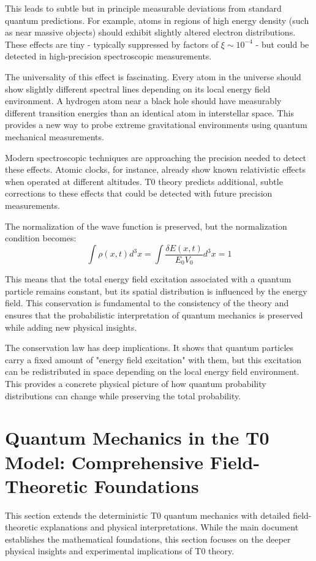 \documentclass[12pt,a4paper]{article}
\newcommand{\deltaE}{\delta E}
\newcommand{\xipar}{\xi}
\theoremstyle{definition}
\theoremstyle{remark}
\begin{document}
This leads to subtle but in principle measurable deviations from standard quantum predictions. For example, atoms in regions of high energy density (such as near massive objects) should exhibit slightly altered electron distributions. These effects are tiny - typically suppressed by factors of $\xipar \sim 10^{-4}$ - but could be detected in high-precision spectroscopic measurements.

The universality of this effect is fascinating. Every atom in the universe should show slightly different spectral lines depending on its local energy field environment. A hydrogen atom near a black hole should have measurably different transition energies than an identical atom in interstellar space. This provides a new way to probe extreme gravitational environments using quantum mechanical measurements.

Modern spectroscopic techniques are approaching the precision needed to detect these effects. Atomic clocks, for instance, already show known relativistic effects when operated at different altitudes. T0 theory predicts additional, subtle corrections to these effects that could be detected with future precision measurements.

The normalization of the wave function is preserved, but the normalization condition becomes:
$$\int \rho(x,t) d^3x = \int \frac{\deltaE(x,t)}{E_0 V_0} d^3x = 1$$

This means that the total energy field excitation associated with a quantum particle remains constant, but its spatial distribution is influenced by the energy field. This conservation is fundamental to the consistency of the theory and ensures that the probabilistic interpretation of quantum mechanics is preserved while adding new physical insights.

The conservation law has deep implications. It shows that quantum particles carry a fixed amount of "energy field excitation" with them, but this excitation can be redistributed in space depending on the local energy field environment. This provides a concrete physical picture of how quantum probability distributions can change while preserving the total probability.
\section{Quantum Mechanics in the T0 Model: Comprehensive Field-Theoretic Foundations}

This section extends the deterministic T0 quantum mechanics with detailed field-theoretic explanations and physical interpretations. While the main document establishes the mathematical foundations, this section focuses on the deeper physical insights and experimental implications of T0 theory.
\end{document}
